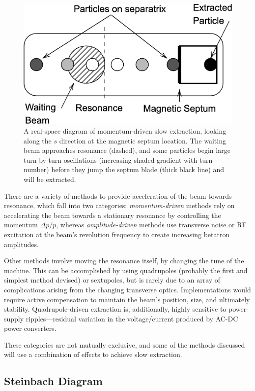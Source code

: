 \documentclass[11pt]{report}
\begin{document}
\begin{figure}
  \centering
  \includegraphics[width=0.6\linewidth]{real-world.png}
  \caption{A real-space diagram of momentum-driven slow extraction, looking along the $s$ direction at the magnetic septum location. The waiting beam approaches resonance (dashed), and some particles begin large turn-by-turn oscillations (increasing shaded gradient with turn number) before they jump the septum blade (thick black line) and will be extracted.}\label{fig:real-world}
\end{figure}

There are a variety of methods to provide acceleration of the beam towards resonance, which fall into two categories: \textit{momentum-driven} methods rely on accelerating the beam towards a stationary resonance by controlling the momentum $\Delta p/p$, whereas \textit{amplitude-driven} methods use transverse noise or RF excitation at the beam's revolution frequency to create increasing betatron amplitudes.

Other methods involve moving the resonance itself, by changing the tune of the machine. This can be accomplished by using quadrupoles (probably the first and simplest method devised) or sextupoles, but is rarely due to an array of complications arising from the changing transverse optics. Implementations would require active compensation to maintain the beam's position, size, and ultimately stability. Quadrupole-driven extraction is, additionally, highly sensitive to power-supply ripples---residual variation in the voltage/current produced by AC-DC power converters. 

These categories are not mutually exclusive, and some of the methods discussed will use a combination of effects to achieve slow extraction.

\subsection{Steinbach Diagram}\label{sec:steinbach}
\end{document}
